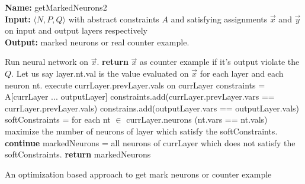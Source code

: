 \begin{algorithm}[t]
  \textbf{Name: } getMarkedNeurons2 \\
  \textbf{Input: } $\langle N,P,Q \rangle$ with abstract constraints $A$ and satisfying assignments $\overrightarrow{x}$ and $\overrightarrow{y}$ on input and output layers respectively\\
  \textbf{Output: } marked neurons or real counter example. 
  \begin{algorithmic}[1]
    \State Run neural network on $\overrightarrow{x}$.
    \State \textbf{return} $\overrightarrow{x}$ as counter example if it's output violate the $Q$. 
    \State Let us say layer.nt.val is the value evaluated on $\overrightarrow{x}$ for each layer and each neuron nt. 
     
        \State execute currLayer.prevLayer.vals on currLayer 
      \Else
        \State constraints = A[currLayer ... outputLayer] 
        \State constraints.add(currLayer.prevLayer.vars == currLayer.prevLayer.vals)
        \State constrains.add(outputLayer.vars == outputLayer.vals)
        \State softConstraints = for each nt $\in$ currLayer.neurons (nt.vars == nt.vals)
        \State maximize the number of neurons of layer which satisfy the softConstraints. 
          \State \textbf{continue}
        \Else
          \State markedNeurons = all neurons of currLayer which does not satisfy the softConstraints. 
          \State \textbf{return} markedNeurons
        \EndIf 
      \EndIf
    \EndFor
  \end{algorithmic}
  \caption{An optimization based approach to get mark neurons or counter example}
  \label{algo:refine2}
\end{algorithm}







